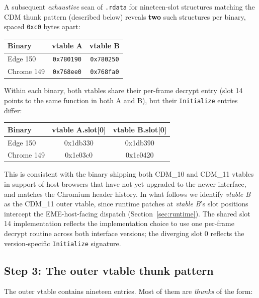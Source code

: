 \documentclass[11pt,letterpaper]{article}
\begin{document}
A subsequent \emph{exhaustive} scan of \texttt{.rdata} for
nineteen-slot structures matching the CDM thunk pattern (described
below) reveals \textbf{two} such structures per binary, spaced
\texttt{0xc0} bytes apart:

\begin{center}\small
\begin{tabular}{lcc}
\toprule
\textbf{Binary} & \textbf{vtable A} & \textbf{vtable B} \\
\midrule
Edge 150    & \texttt{0x780190} & \texttt{0x780250} \\
Chrome 149  & \texttt{0x768ee0} & \texttt{0x768fa0} \\
\bottomrule
\end{tabular}
\end{center}

Within each binary, both vtables share their per-frame decrypt entry
(slot 14 points to the same function in both A and B), but their
\texttt{Initialize} entries differ:

\begin{center}\small
\begin{tabular}{lcc}
\toprule
\textbf{Binary} & \textbf{vtable A.slot[0]} & \textbf{vtable B.slot[0]} \\
\midrule
Edge 150    & 0x1db330 & 0x1db390 \\
Chrome 149  & 0x1e03c0 & 0x1e0420 \\
\bottomrule
\end{tabular}
\end{center}

This is consistent with the binary shipping both CDM\_10 and CDM\_11
vtables in support of host browsers that have not yet upgraded to
the newer interface, and matches the Chromium header history. In
what follows we identify \emph{vtable B} as the CDM\_11 outer
vtable, since runtime patches at \emph{vtable B}'s slot positions
intercept the EME-host-facing dispatch
(Section~\ref{sec:runtime}). The shared slot 14 implementation
reflects the implementation choice to use one per-frame decrypt
routine across both interface versions; the diverging slot 0
reflects the version-specific \texttt{Initialize} signature.

\subsection{Step 3: The outer vtable thunk pattern}
\label{sec:static-thunk}

The outer vtable contains nineteen entries. Most of them are
\emph{thunks} of the form:
\end{document}
